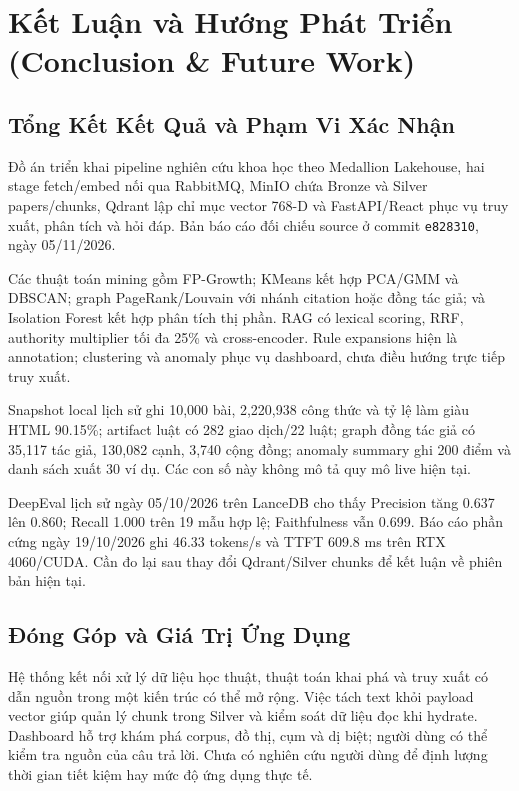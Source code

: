 \chapter{Kết Luận và Hướng Phát Triển (Conclusion \& Future Work)}
\label{chap:conclusion}
\section{Tổng Kết Kết Quả và Phạm Vi Xác Nhận}
Đồ án triển khai pipeline nghiên cứu khoa học theo Medallion Lakehouse, hai stage fetch/embed nối qua RabbitMQ, MinIO chứa Bronze và Silver papers/chunks, Qdrant lập chỉ mục vector 768-D và FastAPI/React phục vụ truy xuất, phân tích và hỏi đáp. Bản báo cáo đối chiếu source ở commit \texttt{e828310}, ngày 05/11/2026.

Các thuật toán mining gồm FP-Growth; KMeans kết hợp PCA/GMM và DBSCAN; graph PageRank/Louvain với nhánh citation hoặc đồng tác giả; và Isolation Forest kết hợp phân tích thị phần. RAG có lexical scoring, RRF, authority multiplier tối đa 25\% và cross-encoder. Rule expansions hiện là annotation; clustering và anomaly phục vụ dashboard, chưa điều hướng trực tiếp truy xuất.

Snapshot local lịch sử ghi 10,000 bài, 2,220,938 công thức và tỷ lệ làm giàu HTML 90.15\%; artifact luật có 282 giao dịch/22 luật; graph đồng tác giả có 35,117 tác giả, 130,082 cạnh, 3,740 cộng đồng; anomaly summary ghi 200 điểm và danh sách xuất 30 ví dụ. Các con số này không mô tả quy mô live hiện tại.

DeepEval lịch sử ngày 05/10/2026 trên LanceDB cho thấy Precision tăng 0.637 lên 0.860; Recall 1.000 trên 19 mẫu hợp lệ; Faithfulness vẫn 0.699. Báo cáo phần cứng ngày 19/10/2026 ghi 46.33 tokens/s và TTFT 609.8 ms trên RTX 4060/CUDA. Cần đo lại sau thay đổi Qdrant/Silver chunks để kết luận về phiên bản hiện tại.

\section{Đóng Góp và Giá Trị Ứng Dụng}
Hệ thống kết nối xử lý dữ liệu học thuật, thuật toán khai phá và truy xuất có dẫn nguồn trong một kiến trúc có thể mở rộng. Việc tách text khỏi payload vector giúp quản lý chunk trong Silver và kiểm soát dữ liệu đọc khi hydrate. Dashboard hỗ trợ khám phá corpus, đồ thị, cụm và dị biệt; người dùng có thể kiểm tra nguồn của câu trả lời. Chưa có nghiên cứu người dùng để định lượng thời gian tiết kiệm hay mức độ ứng dụng thực tế.

